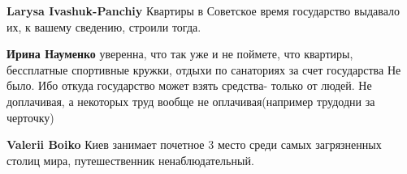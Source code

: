 \begin{itemize}
\begin{itemize}
\begin{itemize} %
\textbf{Larysa Ivashuk-Panchiy} Квартиры в Советское время государство выдавало их, к вашему сведению, строили тогда.

\textbf{Ирина Науменко} уверенна, что так уже и не поймете, что квартиры, бессплатные спортивные кружки, отдыхи по санаториях за счет государства Не было. Ибо откуда государство может взять средства- только от людей. Не доплачивая, а некоторых труд вообще не оплачивая(например трудодни за черточку)
\end{itemize} %

\textbf{Valerii Boiko} Киев занимает почетное 3 место среди самых загрязненных столиц мира, путешественник ненаблюдательный.
\end{itemize} %

\end{itemize} %
